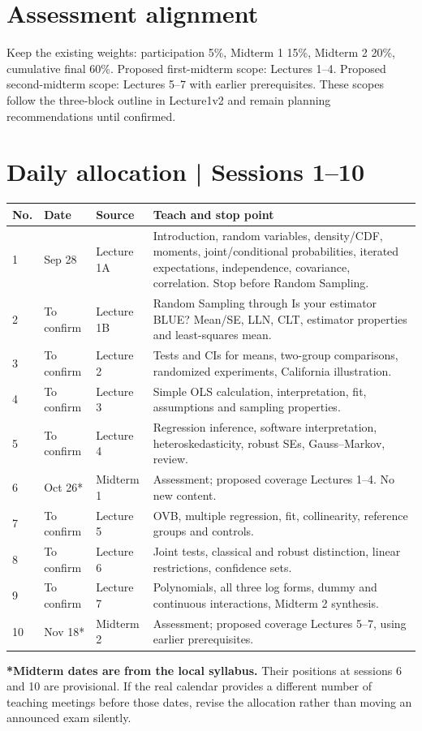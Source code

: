 \documentclass[11pt,a4paper]{article}
\newcommand{\heading}[1]{\section*{\color{accent}#1}}
\begin{document}
\heading{Assessment alignment}
Keep the existing weights: participation 5\%, Midterm 1 15\%, Midterm 2 20\%, cumulative final 60\%. Proposed first-midterm scope: Lectures 1--4. Proposed second-midterm scope: Lectures 5--7 with earlier prerequisites. These scopes follow the three-block outline in Lecture1v2 and remain planning recommendations until confirmed.
\newpage
\heading{Daily allocation | Sessions 1--10}
\small
\begin{tabularx}{\textwidth}{@{}p{9mm}p{23mm}p{28mm}X@{}}\toprule
No. & Date & Source & Teach and stop point\\\midrule
1 & Sep 28 & Lecture 1A & Introduction, random variables, density/CDF, moments, joint/conditional probabilities, iterated expectations, independence, covariance, correlation. Stop before Random Sampling.\\[5pt]
2 & To confirm & Lecture 1B & Random Sampling through Is your estimator BLUE? Mean/SE, LLN, CLT, estimator properties and least-squares mean.\\[5pt]
3 & To confirm & Lecture 2 & Tests and CIs for means, two-group comparisons, randomized experiments, California illustration.\\[5pt]
4 & To confirm & Lecture 3 & Simple OLS calculation, interpretation, fit, assumptions and sampling properties.\\[5pt]
5 & To confirm & Lecture 4 & Regression inference, software interpretation, heteroskedasticity, robust SEs, Gauss--Markov, review.\\[5pt]
6 & Oct 26* & Midterm 1 & Assessment; proposed coverage Lectures 1--4. No new content.\\[5pt]
7 & To confirm & Lecture 5 & OVB, multiple regression, fit, collinearity, reference groups and controls.\\[5pt]
8 & To confirm & Lecture 6 & Joint tests, classical and robust distinction, linear restrictions, confidence sets.\\[5pt]
9 & To confirm & Lecture 7 & Polynomials, all three log forms, dummy and continuous interactions, Midterm 2 synthesis.\\[5pt]
10 & Nov 18* & Midterm 2 & Assessment; proposed coverage Lectures 5--7, using earlier prerequisites.\\\bottomrule
\end{tabularx}
\normalsize
\textbf{*Midterm dates are from the local syllabus.} Their positions at sessions 6 and 10 are provisional. If the real calendar provides a different number of teaching meetings before those dates, revise the allocation rather than moving an announced exam silently.
\end{document}

